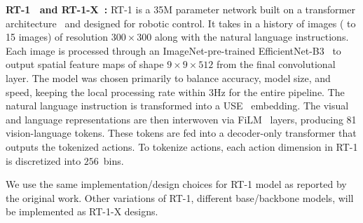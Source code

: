 \noindent\textbf{ RT-1~\cite{rt-1} and RT-1-X~\cite{9}:} RT-1 is a 35M parameter network built on a transformer architecture~\cite{vaswani2017attention} and designed for robotic control. %
It takes in a history of images ( to 15 images) of resolution $300\times300$ along with the natural language instructions. 
Each image is processed through an ImageNet-pre-trained EfficientNet-B3~\cite{tan2019efficientnet} to output spatial feature maps of shape $9\times9\times512$ from the final convolutional layer.
The model was chosen primarily to balance accuracy, model size, and speed, keeping the local processing rate within 3Hz for the entire pipeline.
The natural language instruction is transformed into a USE~\cite{cer2018universal} embedding. 
The visual and language representations are then interwoven via FiLM~\cite{perez2017film} layers, producing 81 vision-language tokens. 
These tokens are fed into a decoder-only transformer that outputs the tokenized actions.
To tokenize actions, each action dimension in RT-1 is discretized into $256$~bins.

We use the same implementation/design choices for RT-1 model as reported by the original work. Other variations of RT-1, \eg different base/backbone models, %
will be implemented as RT-1-X designs.


